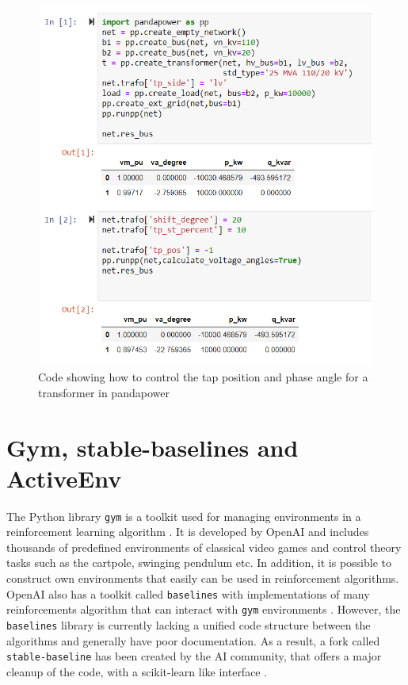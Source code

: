 \documentclass[class=book, crop=false]{standalone}
\begin{document}
\begin{figure}[H]
    \center
    \includegraphics[height=12cm, width=12cm]{figures/control_transformer.PNG}
    \caption[size = 9]{Code showing how to control the tap position and phase angle for a transformer in pandapower}
    \label{fig:method:control_transformer}
\end{figure}

\section{Gym, stable-baselines and ActiveEnv}
The Python library \texttt{gym} is a toolkit used for managing environments in a reinforcement learning algorithm \cite{openai_gym}. It is developed by OpenAI and includes thousands of predefined environments of classical video games and control theory tasks such as the cartpole, swinging pendulum etc. In addition, it is possible to construct own environments that easily can be used in reinforcement algorithms. OpenAI also has a toolkit called \texttt{baselines} with implementations of many reinforcements algorithm that can interact with \texttt{gym} environments \cite{openai_baselines}. However, the \texttt{baselines} library is currently lacking a unified code structure between the algorithms and generally have poor documentation. As a result, a fork called \texttt{stable-baseline} has been created by the AI community, that offers a major cleanup of the code, with a scikit-learn like interface \cite{stable_baselines}.
\end{document}
